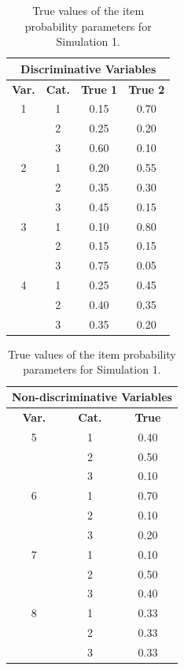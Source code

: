 \documentclass[11pt]{article}
\theoremstyle{plain}
\theoremstyle{definition}
\begin{document}
\begin{table}
    \centering
    \begin{tabular}{cccc}
    \toprule
    \multicolumn{4}{c}{\textbf{Discriminative Variables}}
    \\
    \midrule
    \textbf{Var.} & \textbf{Cat.} & \textbf{True 1} & \textbf{True 2}
    \\
    \midrule
    1 & 1 & 0.15  & 0.70     \\
  & 2 & 0.25  & 0.20    \\
  & 3 & 0.60  & 0.10    \\
2 & 1 & 0.20  & 0.55    \\
  & 2 & 0.35  & 0.30    \\
  & 3 & 0.45  & 0.15    \\
3 & 1 & 0.10  & 0.80    \\
  & 2 & 0.15  & 0.15     \\
  & 3 & 0.75  & 0.05     \\
4 & 1 & 0.25  & 0.45     \\
  & 2 & 0.40  & 0.35     \\
  & 3 & 0.35  & 0.20     \\
  \bottomrule
  \end{tabular}
  \hspace{2em}
  \begin{tabular}{ccc}
  \toprule
  \multicolumn{3}{c}{\textbf{Non-discriminative Variables}}
  \\
  \midrule
    \textbf{Var.} & \textbf{Cat.} & \textbf{True}
    \\
    \midrule
  5 & 1 & 0.40     \\
  & 2 & 0.50     \\
  & 3 & 0.10    \\
6 & 1 & 0.70     \\
  & 2 & 0.10     \\
  & 3 & 0.20    \\
7 & 1 & 0.10    \\
  & 2 & 0.50    \\
  & 3 & 0.40      \\  
8 & 1 & 0.33   \\
  & 2 & 0.33     \\
  & 3 & 0.33    \\ 
  \bottomrule
  \end{tabular}
    \caption{True values of the item probability parameters for Simulation 1.}
    \label{table:sim1_item_prob_estimates_full_LCR}
\end{table}
\end{document}
